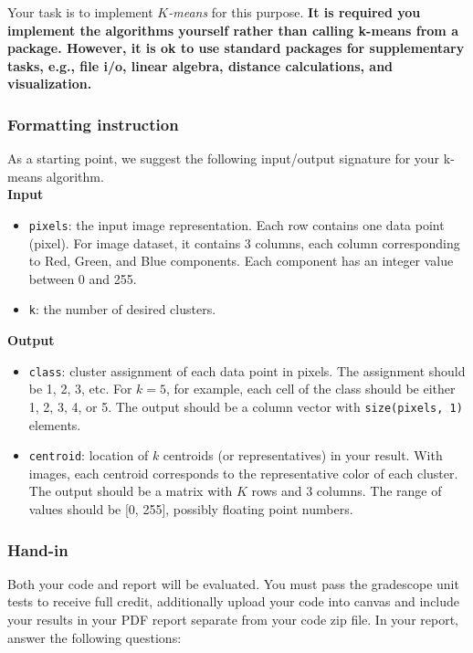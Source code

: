 \documentclass[twoside,10pt]{article}
\begin{document}
Your task is to implement \emph{$K$-means} for this purpose.  {\bf It is required you implement the algorithms yourself rather than calling k-means from a package. However, it is ok to use standard packages for supplementary tasks, e.g., file i/o, linear algebra, distance calculations, and visualization.} 


\subsubsection*{Formatting instruction}

As a starting point, we suggest the following input/output signature for your k-means algorithm.\\

\textbf{Input}
\begin{itemize}
  \item \texttt{pixels}: the input image representation. Each row contains one data point (pixel). For image dataset, it contains 3 columns, each column corresponding to Red, Green, and Blue components. Each component has an integer value between 0 and 255.
  \item \texttt{k}: the number of desired clusters.
\end{itemize}

\textbf{Output}
\begin{itemize}
  \item \texttt{class}: cluster assignment of each data point in pixels. The assignment should be 1, 2, 3, etc. For $k = 5$, for example, each cell of the class should be either 1, 2, 3, 4, or 5. The output should be a column vector with \texttt{size(pixels, 1)} elements.
  \item \texttt{centroid}: location of $k$ centroids (or representatives) in your result. With images, each centroid corresponds to the representative color of each cluster. The output should be a matrix with $K$ rows and 3 columns. The range of values should be [0, 255], possibly floating point numbers.
\end{itemize}

\subsubsection*{Hand-in}
Both your code and report will be evaluated. You must pass the gradescope unit tests to receive full credit, additionally upload your code into canvas and include your results in your PDF report separate from your code zip file. In your report, answer the following questions:
\end{document}

